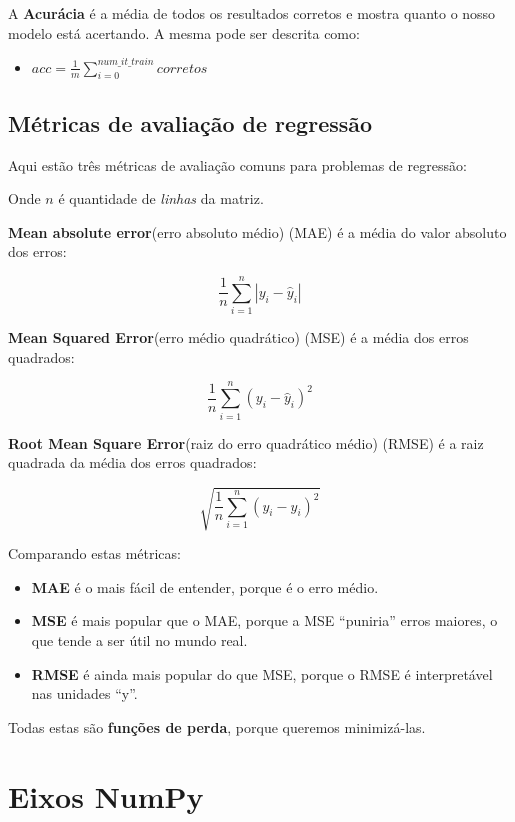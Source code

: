 \documentclass[11pt]{article}
\providecommand{\tightlist}{%
      \setlength{\itemsep}{0pt}\setlength{\parskip}{0pt}}
\begin{document}
A \textbf{Acurácia} é a média de todos os resultados corretos e mostra
quanto o nosso modelo está acertando. A mesma pode ser descrita como:

\begin{itemize}
\tightlist
\item
  \(acc=\frac{1}{m}\sum\limits_{i=0}^{num\_it\_train}corretos\)
\end{itemize}

    \hypertarget{muxe9tricas-de-avaliauxe7uxe3o-de-regressuxe3o}{%
\subsection{Métricas de avaliação de
regressão}\label{muxe9tricas-de-avaliauxe7uxe3o-de-regressuxe3o}}

Aqui estão três métricas de avaliação comuns para problemas de
regressão:

Onde \(n\) é quantidade de \emph{linhas} da matriz.

\textbf{Mean absolute error}(erro absoluto médio) (MAE) é a média do
valor absoluto dos erros:

\[\frac 1n\sum_{i=1}^n|y_i-\hat{y}_i|\]

\textbf{Mean Squared Error}(erro médio quadrático) (MSE) é a média dos
erros quadrados:

\[\frac 1n\sum_{i=1}^n(y_i-\hat{y}_i)^2\]

\textbf{Root Mean Square Error}(raiz do erro quadrático médio) (RMSE) é
a raiz quadrada da média dos erros quadrados:

\[\sqrt{\frac 1n\sum_{i=1}^n(y_i-\hat{y}_i)^2}\]

Comparando estas métricas:

\begin{itemize}
\tightlist
\item
  \textbf{MAE} é o mais fácil de entender, porque é o erro médio.
\item
  \textbf{MSE} é mais popular que o MAE, porque a MSE ``puniria'' erros
  maiores, o que tende a ser útil no mundo real.
\item
  \textbf{RMSE} é ainda mais popular do que MSE, porque o RMSE é
  interpretável nas unidades ``y''.
\end{itemize}

Todas estas são \textbf{funções de perda}, porque queremos minimizá-las.
\clearpage

\hypertarget{eixos-numpy}{%
\section{Eixos NumPy}\label{eixos-numpy}}
\end{document}
